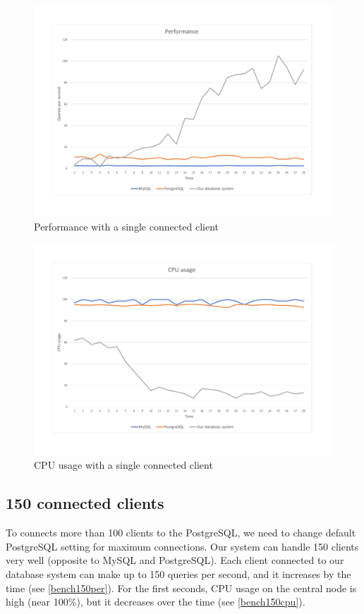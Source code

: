 \begin{figure}[H]
    \centering
    \includegraphics[width=.8\linewidth]{excel/80per.pdf}
    \caption{Performance with a single connected client}
    \label{bench80per}
\end{figure}


\begin{figure}[H]
    \centering
    \includegraphics[width=.8\linewidth]{excel/80cpu.pdf}
    \caption{CPU usage with a single connected client}
    \label{bench80cpu}
\end{figure}

\subsection{150 connected clients}
To connects more than 100 clients to the PostgreSQL, we need to change  default PostgreSQL setting for maximum connections. Our system can handle 150 clients very well (opposite to MySQL and PostgreSQL). Each client connected to our database system can make up to 150 queries per second, and it increases by the time (see \ref{bench150per}). For the first seconds, CPU usage on the central node is high (near 100\%), but it decreases over the time (see \ref{bench150cpu}).

